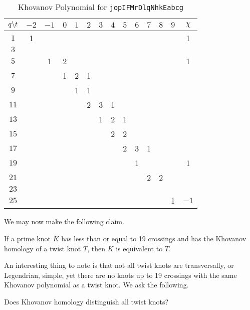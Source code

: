     \begin{table}
        \centering
        \begin{tabular}{| c | c | c | c | c | c | c | c | c | c | c | c | c | c |}
            \hline
            $q\symbol{92}t$&$-2$&$-1$&$0$&$1$&$2$&$3$&$4$&$5$&$6$&$7$&$8$&$9$&$\chi$\\
            \hline
            $1$&1&&&&&&&&&&&&1\\
            \hline
            $3$&&&&&&&&&&&&&\\
            \hline
            $5$&&1&2&&&&&&&&&&1\\
            \hline
            $7$&&&1&2&1&&&&&&&&\\
            \hline
            $9$&&&&1&1&&&&&&&&\\
            \hline
            $11$&&&&&2&3&1&&&&&&\\
            \hline
            $13$&&&&&&1&2&1&&&&&\\
            \hline
            $15$&&&&&&&2&2&&&&&\\
            \hline
            $17$&&&&&&&&2&3&1&&&\\
            \hline
            $19$&&&&&&&&&1&&&&1\\
            \hline
            $21$&&&&&&&&&&2&2&&\\
            \hline
            $23$&&&&&&&&&&&&&\\
            \hline
            $25$&&&&&&&&&&&&1&$-1$\\
            \hline
        \end{tabular}
        \caption{Khovanov Polynomial for \texttt{jopIFMrDlqNhkEabcg}}
        \label{table:jopIFMrDlqNhkEabcg_kho}
    \end{table}
    We may now make the following claim.
    \begin{theorem}
        If a prime knot $K$ has less than or equal to 19 crossings and has
        the Khovanov homology of a twist knot $T$,
        then $K$ is equivalent to $T$.
    \end{theorem}
    An interesting thing to note is that not all twist knots are
    transversally, or Legendrian, simple, yet there are no knots up to
    19 crossings with the same Khovanov polynomial as a twist knot. We
    ask the following.
    \begin{question}
        Does Khovanov homology distinguish all twist knots?
    \end{question}
